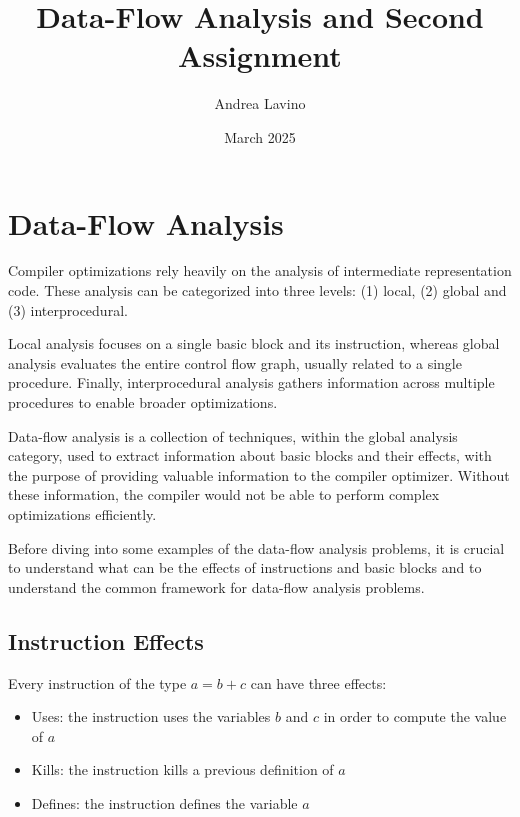 \documentclass{article}
\title{Data-Flow Analysis and Second Assignment}
\author{Andrea Lavino}
\date{March 2025}
\begin{document}
\maketitle

\clearpage

\tableofcontents

\clearpage

\section{Data-Flow Analysis}

Compiler optimizations rely heavily on the analysis of intermediate representation code. These analysis can be categorized into three levels: (1) local, (2) global and (3) interprocedural.

Local analysis focuses on a single basic block and its instruction, whereas global analysis evaluates the entire control flow graph, usually related to a single procedure. Finally, interprocedural analysis gathers information across multiple procedures to enable broader optimizations. 

Data-flow analysis is a collection of techniques, within the global analysis category, used to extract information about basic blocks and their effects, with the purpose of providing valuable information to the compiler optimizer. Without these information, the compiler would not be able to perform complex optimizations efficiently.

Before diving into some examples of the data-flow analysis problems, it is crucial to understand what can be the effects of instructions and basic blocks and to understand the common framework for data-flow analysis problems.

\subsection{Instruction Effects}

Every instruction of the type $a = b + c$ can have three effects:

\begin{itemize}
    \item Uses: the instruction uses the variables $b$ and $c$ in order to compute the value of $a$
    \item Kills: the instruction kills a previous definition of $a$
    \item Defines: the instruction defines the variable $a$
\end{itemize}
\end{document}
